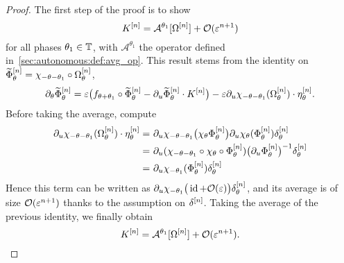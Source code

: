 \begin{proof}
The first step of the proof is to show 
\begin{equation*}
  K^{[n]} = \mathcal{A}^{\theta_1}[ \Omega^{[n]} ] + \mathcal{O}( \varepsilon^{n+1} )
\end{equation*}
for all phases $\theta_1 \in \mathbb{T}$, with $\mathcal{A}^{\theta_1}$ the
operator defined in~\eqref{sec:autonomous:def:avg_op}. This result stems
from the identity on $\widetilde{\Phi}^{[n]} _\theta = \chi_{-\theta -
\theta_1} \circ \Omega^{[n]} _\theta$, 
\begin{equation*}
  \partial_\theta \widetilde{\Phi}^{[n]} _\theta 
  = \varepsilon \big( f_{\theta+\theta_1} \circ \widetilde{\Phi}^{[n]} _\theta
    - \partial_u \widetilde{\Phi}^{[n]} _\theta \cdot K^{[n]} 
  \big)
  - \varepsilon \partial_u \chi_{-\theta - \theta_1}(\Omega^{[n]} _\theta) 
    \cdot \eta^{[n]} _\theta .
\end{equation*}
Before taking the average, compute
\begin{align*}
  \pa_u \chi_{-\theta - \theta_1}(\Omega\rk n _\theta) 
    \cdot \eta\rk n _\theta = &\ 
  \pa_u \chi_{-\theta-\theta_1} \big( \chi_\theta \Phi\rk n _\theta \big)
  \pa_u \chi_\theta (\Phi\rk n _\theta) \delta\rk n _\theta
  \\ = &\ 
  \pa_u ( \chi_{-\theta-\theta_1} \circ \chi_\theta 
    \circ \Phi\rk n _\theta)
  \big( \pa_u \Phi\rk n _\theta \big)^{-1} \delta\rk n _\theta
  \\ = &\ 
  \pa_u \chi_{-\theta_1} (\Phi\rk n _\theta) \delta\rk n _\theta
\end{align*}
Hence this term can be written as $\partial_u \chi_{-\theta_1} \big( \operatorname{id} +
\mathcal{O}(\varepsilon) \big) \delta^{[n]} _\theta$, and its average is of size
$\mathcal{O}( \varepsilon^{n+1} )$ thanks to the assumption on $\delta^{[n]}$. Taking
the average of the previous identity, we finally obtain 
\begin{equation*}
  K^{[n]} = \mathcal{A}^{\theta_1} [\Omega^{[n]}] + \mathcal{O}( \varepsilon^{n+1} ) .
\end{equation*}



\end{proof}
